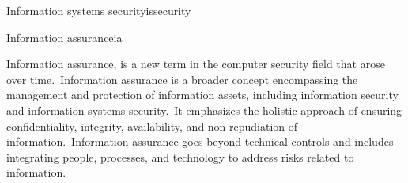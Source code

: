 \begin{center}
\begin{minipage}{\textwidth}
\begin{theo}{Information systems security}{issecurity}
\end{theo}
\vspace{5pt}
\begin{theo}{Information assurance}{ia}
\par Information assurance, is a new term in the computer security field that arose over time.\ Information assurance is a broader concept encompassing the management and protection of information assets, including information security and information systems security.\ It emphasizes the holistic approach of ensuring confidentiality, integrity, availability, and non-repudiation of information.\ Information assurance goes beyond technical controls and includes integrating people, processes, and technology to address risks related to information.\cite{boyle2023}
\end{theo}
\end{minipage}
\end{center}
\vspace{10pt}
